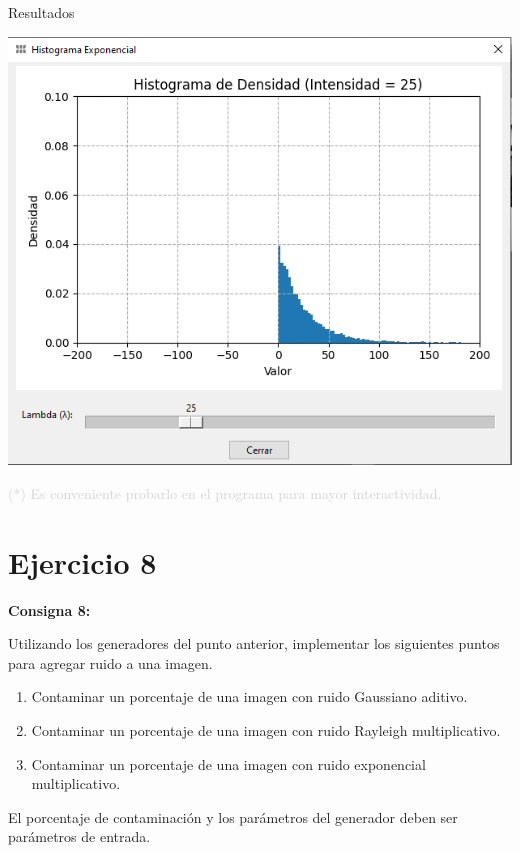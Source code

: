 \documentclass{beamer}
\begin{document}
\begin{frame}[fragile]{Resultados}
\begin{minipage}{0.32\linewidth}
	\end{minipage}\hfill
	\begin{minipage}{0.32\linewidth}
		\centering
		\includegraphics[width=\linewidth]{../results/dist_exponencial}
	\end{minipage}
	
	\vfill
\footnotesize \textcolor{lightgray}{(*) Es conveniente probarlo en el programa para mayor interactividad.}
\end{frame}

\section{Ejercicio 8}

\begin{frame}
	\begin{center}
		\textcolor{unahurverde}{\textbf{Consigna 8:}}
	\end{center}
	\justifying
	
	Utilizando los generadores del punto anterior, implementar los siguientes puntos para agregar ruido a una imagen.
	
	\begin{enumerate}%
		\item Contaminar un porcentaje de una imagen con ruido Gaussiano aditivo.
		\item Contaminar un porcentaje de una imagen con ruido Rayleigh multiplicativo.
		\item Contaminar un porcentaje de una imagen con ruido exponencial multiplicativo.
	\end{enumerate}
	
	\vspace{0.3cm}
	
	El porcentaje de contaminación y los parámetros del generador deben ser parámetros de entrada.
\end{frame}
\end{document}

